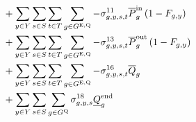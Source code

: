 \documentclass{article}
\begin{document}
\begin{align}
& + \sum\limits_{\iYear \in \sYears}\sum\limits_{\iScenario \in \sScenarios}\sum\limits_{\iInterval \in \sIntervals} \sum\limits_{\iGenerator \in \sStorageExisting} - \dMaxChargingRateExisting \cPowerChargingMax \left(1 - \cRetirementIndicator\right)\\
& + \sum\limits_{\iYear \in \sYears}\sum\limits_{\iScenario \in \sScenarios}\sum\limits_{\iInterval \in \sIntervals} \sum\limits_{\iGenerator \in \sStorageExisting} - \dMaxDischargingRateExisting \cPowerDischargingMax \left(1 - \cRetirementIndicator\right)\\
& + \sum\limits_{\iYear \in \sYears}\sum\limits_{\iScenario \in \sScenarios}\sum\limits_{\iInterval \in \sIntervals} \sum\limits_{\iGenerator \in \sStorageExisting} - \dMaxStorageEnergyExisting \cStorageUnitEnergyMax\\
& + \sum\limits_{\iYear \in \sYears}\sum\limits_{\iScenario \in \sScenarios} \sum\limits_{\iGenerator \in \sStorage} \dMinStorageEnergyIntervalEnd \cStorageUnitEnergyIntervalEndMin\\

\end{align}
\end{document}
